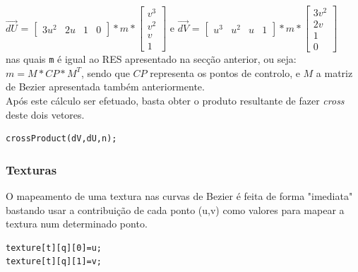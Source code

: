 \documentclass{article}
\begin{document}
$\overrightarrow{dU}$ = $\begin{bmatrix} 3u^2 & 2u & 1 & 0 \end{bmatrix} * m * \begin{bmatrix} v^3 \\ v^2 \\ v \\ 1 \end{bmatrix}$ e $\overrightarrow{dV}$ = $\begin{bmatrix} u^3 & u^2 & u & 1 \end{bmatrix} * m * \begin{bmatrix} 3v^2 \\ 2v \\ 1 \\ 0 \end{bmatrix}$\\
nas quais \texttt{m} é igual ao RES apresentado na secção anterior, ou seja:\\
$m = M * CP * M^T$, sendo que $CP$ representa os pontos de controlo, e $M$ a matriz de Bezier apresentada também anteriormente.\\
Após este cálculo ser efetuado, basta obter o produto resultante de fazer \textit{cross} deste dois vetores.

\begin{verbatim}
crossProduct(dV,dU,n);
\end{verbatim}

\subsubsection{Texturas}
O mapeamento de uma textura nas curvas de Bezier é feita de forma "imediata" bastando usar a contribuição de cada ponto (u,v) como valores para mapear a textura num determinado ponto.

\begin{verbatim}
texture[t][q][0]=u;
texture[t][q][1]=v;
\end{verbatim}

\newpage
\end{document}
